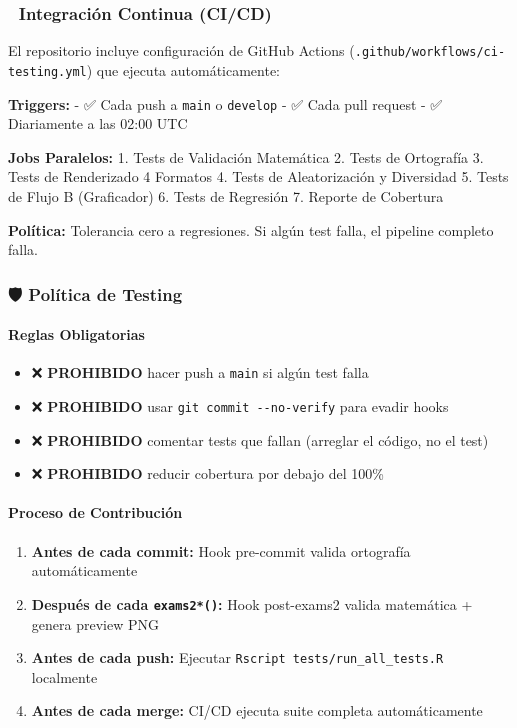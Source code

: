 \documentclass[
]{article}
\providecommand{\tightlist}{%
  \setlength{\itemsep}{0pt}\setlength{\parskip}{0pt}}
\begin{document}
\subsubsection{🔄 Integración Continua
(CI/CD)}\label{integraciuxf3n-continua-cicd}

El repositorio incluye configuración de GitHub Actions
(\texttt{.github/workflows/ci-testing.yml}) que ejecuta automáticamente:

\textbf{Triggers:} - ✅ Cada push a \texttt{main} o \texttt{develop} -
✅ Cada pull request - ✅ Diariamente a las 02:00 UTC

\textbf{Jobs Paralelos:} 1. Tests de Validación Matemática 2. Tests de
Ortografía 3. Tests de Renderizado 4 Formatos 4. Tests de Aleatorización
y Diversidad 5. Tests de Flujo B (Graficador) 6. Tests de Regresión 7.
Reporte de Cobertura

\textbf{Política:} Tolerancia cero a regresiones. Si algún test falla,
el pipeline completo falla.

\subsubsection{🛡️ Política de Testing}\label{poluxedtica-de-testing}

\paragraph{Reglas Obligatorias}\label{reglas-obligatorias}

\begin{itemize}
\tightlist
\item
  ❌ \textbf{PROHIBIDO} hacer push a \texttt{main} si algún test falla
\item
  ❌ \textbf{PROHIBIDO} usar \texttt{git\ commit\ -\/-no-verify} para
  evadir hooks
\item
  ❌ \textbf{PROHIBIDO} comentar tests que fallan (arreglar el código,
  no el test)
\item
  ❌ \textbf{PROHIBIDO} reducir cobertura por debajo del 100\%
\end{itemize}

\paragraph{Proceso de Contribución}\label{proceso-de-contribuciuxf3n}

\begin{enumerate}
\def\labelenumi{\arabic{enumi}.}
\tightlist
\item
  \textbf{Antes de cada commit:} Hook pre-commit valida ortografía
  automáticamente
\item
  \textbf{Después de cada \texttt{exams2*()}:} Hook post-exams2 valida
  matemática + genera preview PNG
\item
  \textbf{Antes de cada push:} Ejecutar
  \texttt{Rscript\ tests/run\_all\_tests.R} localmente
\item
  \textbf{Antes de cada merge:} CI/CD ejecuta suite completa
  automáticamente
\end{enumerate}
\end{document}
